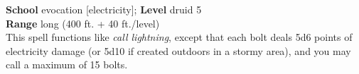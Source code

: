 \textbf{School} evocation [electricity]; \textbf{Level} druid 5\\
\textbf{Range} long (400 ft. + 40 ft./level)\\
This spell functions like \textit{call lightning}, except that each bolt deals 5d6 points of electricity damage (or 5d10 if created outdoors in a stormy area), and you may call a maximum of 15 bolts.\\
